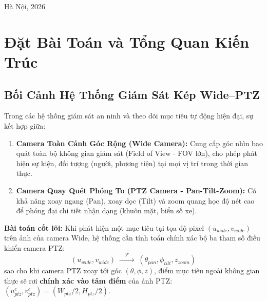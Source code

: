 \documentclass[11pt,a4paper]{article}
\begin{document}
\begin{titlepage}
\begin{center}
        \vfill
        {\large Hà Nội, 2026}
    \end{center}
\end{titlepage}

\tableofcontents
\newpage

\section{Đặt Bài Toán và Tổng Quan Kiến Trúc}

\subsection{Bối Cảnh Hệ Thống Giám Sát Kép Wide--PTZ}
Trong các hệ thống giám sát an ninh và theo dõi mục tiêu tự động hiện đại, sự kết hợp giữa:
\begin{enumerate}[label=\textbf{\arabic*.}]
    \item \textbf{Camera Toàn Cảnh Góc Rộng (Wide Camera):} Cung cấp góc nhìn bao quát toàn bộ không gian giám sát (Field of View - FOV lớn), cho phép phát hiện sự kiện, đối tượng (người, phương tiện) tại mọi vị trí trong thời gian thực.
    \item \textbf{Camera Quay Quét Phóng To (PTZ Camera - Pan-Tilt-Zoom):} Có khả năng xoay ngang (Pan), xoay dọc (Tilt) và zoom quang học độ nét cao để phóng đại chi tiết nhận dạng (khuôn mặt, biển số xe).
\end{enumerate}

\textbf{Bài toán cốt lõi:} Khi phát hiện một mục tiêu tại tọa độ pixel $(u_{wide}, v_{wide})$ trên ảnh của camera Wide, hệ thống cần tính toán chính xác bộ ba tham số điều khiển camera PTZ:
\begin{equation}
    (u_{wide}, v_{wide}) \;\xrightarrow{\quad\mathcal{F}\quad}\; (\theta_{pan}, \phi_{tilt}, z_{zoom})
\end{equation}
sao cho khi camera PTZ xoay tới góc $(\theta, \phi, z)$, điểm mục tiêu ngoài không gian thực sẽ rơi \textbf{chính xác vào tâm điểm} của ảnh PTZ: $(u_{ptz}^{c}, v_{ptz}^{c}) = (W_{ptz}/2, H_{ptz}/2)$.
\end{document}
